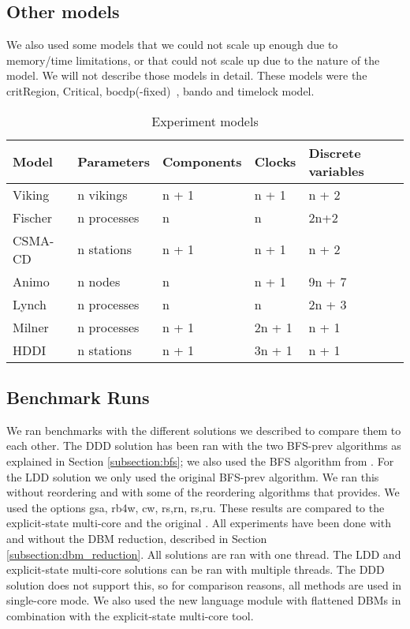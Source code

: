 \subsection{Other models}
We also used some models that we could not scale up enough due to memory/time limitations, or that could not scale up due to the nature of the model. We will not describe those models in detail. These models were the critRegion, Critical, bocdp(-fixed)~\cite{641264}, bando and timelock model.

\begin{table}
\label{tab:experiments-variables}
    \begin{tabular}{|l|l|l|l|l|}
    \hline
     Model  & Parameters  & Components & Clocks & Discrete variables \\ \hline
    Viking  & n vikings   & n + 1      & n + 1  & n + 2              \\
    Fischer & n processes & n          & n      & 2n+2               \\
    CSMA-CD & n stations  & n + 1      & n + 1  & n + 2              \\
    Animo   & n nodes     & n          & n + 1  & 9n + 7             \\
    Lynch   & n processes & n          & n      & 2n + 3             \\
    Milner  & n processes & n + 1      & 2n + 1 & n + 1              \\
    HDDI    & n stations  & n + 1      & 3n + 1 & n + 1              \\ \hline
    \end{tabular}
\caption{Experiment models}
\end{table}

\subsection{Benchmark Runs}
We ran benchmarks with the different solutions we described to compare them to each other. The DDD solution has been ran with the two BFS-prev algorithms as explained in Section \ref{subsection:bfs}; we also used the BFS algorithm from \ltsmin{}. For the LDD solution we only used the original BFS-prev algorithm. We ran this without reordering and with some of the reordering algorithms that \ltsmin{} provides. We used the options gsa, rb4w, cw, rs,rn, rs,ru. These results are compared to the explicit-state multi-core \ltsmin{} and the original \uppaal{}. All experiments have been done with and without the DBM reduction, described in Section \ref{subsection:dbm_reduction}. All solutions are ran with one thread. The LDD and explicit-state multi-core solutions can be ran with multiple threads. The DDD solution does not support this, so for comparison reasons, all methods are used in single-core mode. We also used the new language module with flattened DBMs in combination with the explicit-state multi-core tool.
